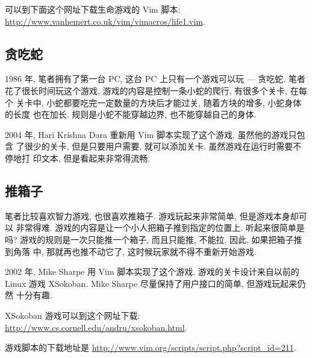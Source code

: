 可以到下面这个网址下载生命游戏的 Vim 脚本:
\url{http://www.vanhemert.co.uk/vim/vimacros/life1.vim}.

\subsection{贪吃蛇}
\label{subsec:nibbles}

1986 年, 笔者拥有了第一台 PC, 这台 PC 上只有一个游戏可以玩 --- 贪吃蛇. 笔者
花了很长时间玩这个游戏, 游戏的内容是控制一条小蛇的爬行, 有很多个关卡, 在每个
关卡中, 小蛇都要吃完一定数量的方块后才能过关, 随着方块的增多, 小蛇身体的长度
也在加长. 规则是小蛇不能穿越边界, 也不能穿越自己的身体.

2004 年, Hari Krishna Dara 重新用 Vim 脚本实现了这个游戏. 虽然他的游戏只包含
了很少的关卡, 但是只要用户需要, 就可以添加关卡. 虽然游戏在运行时需要不停地打
印文本, 但是看起来非常得流畅.

\subsection{推箱子}
\label{subsec:sokoban}

笔者比较喜欢智力游戏, 也很喜欢推箱子. 游戏玩起来非常简单, 但是游戏本身却可以
非常得难. 游戏的内容是让一个小人把箱子推到指定的位置上. 听起来很简单是吗?
游戏的规则是一次只能推一个箱子, 而且只能推, 不能拉, 因此, 如果把箱子推到角落
中, 那就再也推不动它了, 这时候玩家就不得不重新开始游戏.

2002 年, Mike Sharpe 用 Vim 脚本实现了这个游戏, 游戏的关卡设计来自以前的
Linux 游戏 XSokoban. Mike Sharpe 尽量保持了用户接口的简单, 但游戏玩起来仍然
十分有趣.

\begin{warning}
    XSokoban 游戏可以到这个网址下载:
    \url{http://www.cs.cornell.edu/andru/xsokoban.html}.
\end{warning}

游戏脚本的下载地址是 \url{http://www.vim.org/scripts/script.php?script_id=211}.
